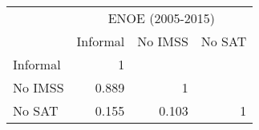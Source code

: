\begin{tabular}{l|rrr}
\toprule
\multicolumn{1}{r}{} & \multicolumn{3}{c}{ENOE (2005-2015)} \\
\cmidrule{2-4}      & \multicolumn{1}{l}{Informal} & \multicolumn{1}{l}{No IMSS} & \multicolumn{1}{l}{No SAT} \\
\midrule
\midrule
Informal & 1     &       &  \\
No IMSS & 0.889 & 1     &  \\
No SAT & 0.155 & 0.103 & 1 \\
\bottomrule
\bottomrule
\end{tabular}%
